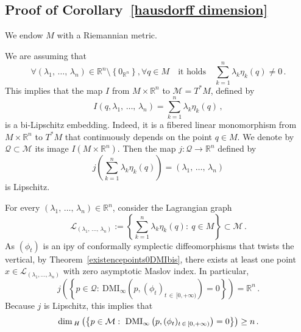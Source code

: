 \documentclass[AHL, Unicode, longabstracts, published]{cedram}
\newcommand*\M{\mathcal{M}}
\newcommand*\cl{\mathcal{L}}
\newcommand*\cal{\mathcal}
\newcommand{\DMI}{\mathrm{DMI}}
\newcommand*\R{\mathbb{R}}
\renewcommand*\dim{{\rm dim}\,}
\let\oldforall\forall
\renewcommand*{\forall}{\mathrel{\oldforall}}
\begin{document}
\subsection{Proof of Corollary~\ref{hausdorff dimension}}

We endow $M$ with a Riemannian metric.

We are assuming that
\begin{equation}\label{cor dim hau hyp}
\forall (\lambda_1,\,\dots,\,\lambda_n)\in\R^n\setminus\left\{0_{\R^n}\right\}, \forall q\in M\quad\text{it holds}\quad \sum_{k=1}^n\lambda_k\eta_k(q)\neq 0\,.
\end{equation}
This implies that the map $I$ from $M\times \R^n$ to $\M=T^*M$, defined by
\[
I(q, \lambda_1,\,\dots,\,\lambda_n)=\sum_{k=1}^n\lambda_k\eta_k(q)\,,
\]
is a bi-Lipschitz embedding. Indeed, it is a fibered linear monomorphism from $M\times \R^n$ to $T^*M$ that continuously depends on the point $q\in M$. We denote by $\cal Q\subset \M$ its image $I(M\times \R^n)$. Then the map $j:\cal Q\to\R^n$ defined by
\[
j\left(\sum_{k=1}^n\lambda_k\eta_k(q)\right)=(\lambda_1,\,\dots,\,\lambda_n)
\]
is Lipschitz.

For every $(\lambda_1,\,\dots,\,\lambda_n)\in\R^n$, consider the Lagrangian graph
\[
\cl_{(\lambda_1,\,\dots,\,\lambda_n)}:=\left\{
\sum_{k=1}^n\lambda_k\eta_k(q) :\ q\in M\right\}\subset \M\,.
\]
As $(\phi_t)$ is an ipy of conformally symplectic diffeomorphisms that twists the vertical, by Theorem~\ref{existencepoints0DMIbis}, there exists at least one point $x\in\cl_{(\lambda_1,\dots,\lambda_n)}$ with zero asymptotic Maslov index. In particular,{
\[
j\left(\left\{ p\in\cal Q :\ \DMI_\infty\left(p,(\phi_t)_{t\,\in\,[0,+\infty)}\right)=0 \right\} \right)= \R^n\,.
\]
Because $j$ is Lipschitz, this implies that}
\[
\dim_H\left(\left\{ p\in \M :\ \DMI_\infty\left(p,(\phi_t)_{t\,\in\,[0,+\infty)}\right)=0 \right\}\right)\geq n\,.
\]





\end{document}
